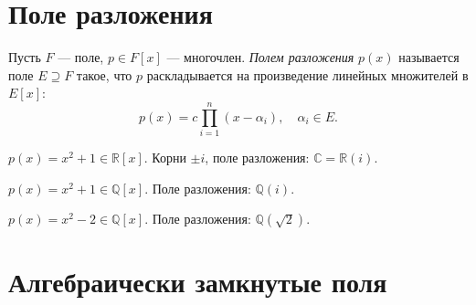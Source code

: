 \section{Поле разложения}

\begin{definition}
    Пусть $F$ --- поле, $p \in F[x]$ --- многочлен. \emph{Полем разложения} $p(x)$ называется
    поле $E \supseteq F$ такое, что $p$ раскладывается на произведение линейных множителей в $E[x]$:
    \[
        p(x) = c \prod_{i=1}^n (x - \alpha_i), \quad \alpha_i \in E.
    \]
\end{definition}

\begin{examplelist}
        \item $p(x) = x^2 + 1 \in \mathbb{R}[x]$. Корни $\pm i$, поле разложения: $\mathbb{C} = \mathbb{R}(i)$.
        \item $p(x) = x^2 + 1 \in \mathbb{Q}[x]$. Поле разложения: $\mathbb{Q}(i)$.
        \item $p(x) = x^2 - 2 \in \mathbb{Q}[x]$. Поле разложения: $\mathbb{Q}(\sqrt{2})$.
\end{examplelist}

\section{Алгебраически замкнутые поля}

